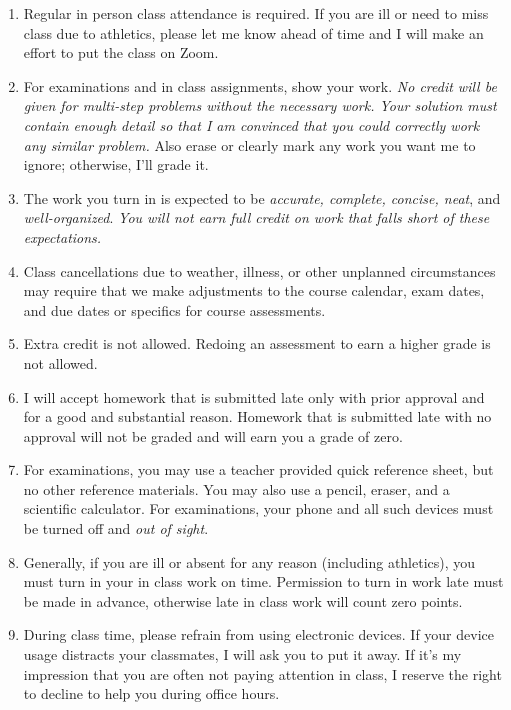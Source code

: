\documentclass[12pt]{article}
\newcounter{ex}\setcounter{ex}{0}
\begin{document}
\begin{enumerate}

\item Regular in person class attendance is required. If you are ill or need to miss 
class due to athletics, please let me know ahead of time and I will make an effort to put the class on Zoom.

\item For examinations and in class assignments, show your work.  \emph{No credit will be given for multi-step problems without the necessary work. Your solution must contain enough detail
so that I am convinced that you could correctly work any similar problem.} Also erase or clearly mark any work you want me to ignore; otherwise,
I'll grade it.  

\item The work you turn in is expected to be \emph{accurate, 
complete, concise, neat}, and \emph{well-organized}.  
\emph{You will not earn full credit on work that falls short of 
these expectations.}

\item Class cancellations due to weather, illness, or other 
unplanned circumstances may require that we make  adjustments
to the course calendar, exam dates, and due dates or specifics for 
course assessments. 


\item Extra credit is not allowed. Redoing an assessment to earn a higher grade is not allowed.

\item I will accept homework that is submitted late only with prior approval and for a good and substantial reason. Homework 
that is submitted late with no approval will not be graded and will earn you a grade of zero.

\item For examinations, you may use a teacher provided quick reference sheet, 
but no other reference materials. You may also use a pencil, eraser, 
and a scientific calculator. For examinations, your phone and all such
devices must be turned off and \emph{out of sight}. 

\item Generally, if you are ill or absent for any reason (including 
athletics), you must turn in your in class work on time. Permission to
turn in work late must be made in advance, otherwise late in class work 
will count zero points.


 

\item During class time, please refrain from using electronic devices. If your 
device usage distracts your classmates, I will ask you to put it away. If it's my 
impression that you are often not paying attention in class, I reserve the right to 
decline to help you during office hours.


\end{enumerate}
\end{document}
